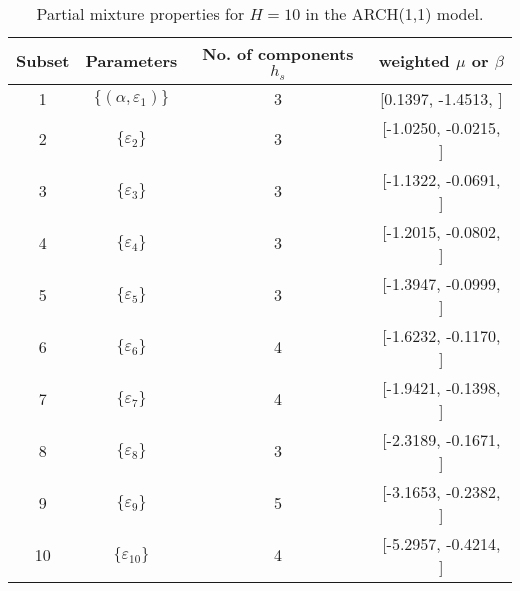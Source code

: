 \begin{table}[h] 
\centering 
\caption{Partial mixture properties for $H=10$ in the ARCH(1,1) model.} 
\label{tab:pmits_arch} 
\begin{tabular}{cccc}  
 Subset & Parameters& No. of components $h_{s}$ & weighted $\mu$ or $\beta$  \\ \hline 
1 & $\{(\alpha,\varepsilon_{1})\}$ & 3 & [0.1397, -1.4513, ]   \\ [1ex] 
2 & $\{\varepsilon_{2}\}$ & 3 & [-1.0250, -0.0215, ]   \\ [1ex] 
3 & $\{\varepsilon_{3}\}$ & 3 & [-1.1322, -0.0691, ]   \\ [1ex] 
4 & $\{\varepsilon_{4}\}$ & 3 & [-1.2015, -0.0802, ]   \\ [1ex] 
5 & $\{\varepsilon_{5}\}$ & 3 & [-1.3947, -0.0999, ]   \\ [1ex] 
6 & $\{\varepsilon_{6}\}$ & 4 & [-1.6232, -0.1170, ]   \\ [1ex] 
7 & $\{\varepsilon_{7}\}$ & 4 & [-1.9421, -0.1398, ]   \\ [1ex] 
8 & $\{\varepsilon_{8}\}$ & 3 & [-2.3189, -0.1671, ]   \\ [1ex] 
9 & $\{\varepsilon_{9}\}$ & 5 & [-3.1653, -0.2382, ]   \\ [1ex] 
10 & $\{\varepsilon_{10}\}$ & 4 & [-5.2957, -0.4214, ]   \\ [1ex] 
\hline 
\end{tabular} 
\end{table} 
